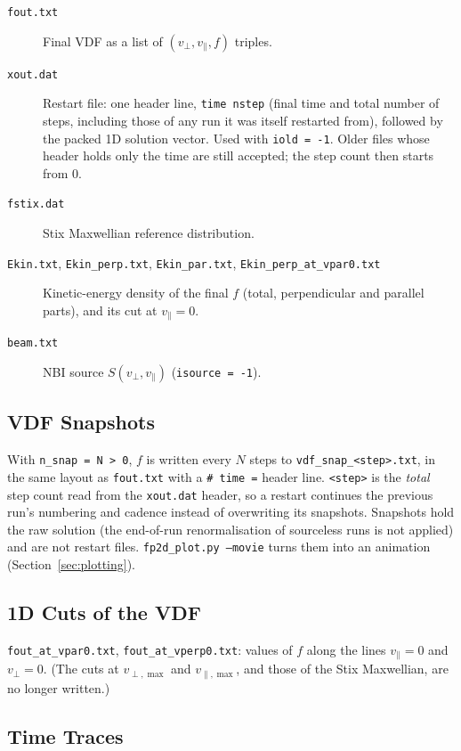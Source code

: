 \documentclass[11pt,a4paper]{article}
\newcommand{\vp}{v_\perp}
\newcommand{\vpa}{v_\parallel}
\newcommand{\vpmax}{v_{\perp,\max}}
\newcommand{\vpamax}{v_{\parallel,\max}}
\begin{document}
\begin{description}
  \item[\texttt{fout.txt}] Final VDF as a list of $(\vp, \vpa, f)$ triples.
  \item[\texttt{xout.dat}] Restart file: one header line, \texttt{time nstep}
        (final time and total number of steps, including those of any run it
        was itself restarted from), followed by the packed 1D solution vector.
        Used with \texttt{iold = -1}.  Older files whose header holds only the
        time are still accepted; the step count then starts from 0.
  \item[\texttt{fstix.dat}] Stix Maxwellian reference distribution.
  \item[\texttt{Ekin.txt}, \texttt{Ekin\_perp.txt}, \texttt{Ekin\_par.txt},
        \texttt{Ekin\_perp\_at\_vpar0.txt}] Kinetic-energy density of the final
        $f$ (total, perpendicular and parallel parts), and its cut at
        $\vpa = 0$.
  \item[\texttt{beam.txt}] NBI source $S(\vp,\vpa)$ (\texttt{isource = -1}).
\end{description}

\subsection{VDF Snapshots}
\label{sec:snap}

With \texttt{n\_snap = N > 0}, $f$ is written every $N$ steps to
\texttt{vdf\_snap\_<step>.txt}, in the same layout as \texttt{fout.txt} with a
\texttt{\# time =} header line.  \texttt{<step>} is the \emph{total} step count
read from the \texttt{xout.dat} header, so a restart continues the previous
run's numbering and cadence instead of overwriting its snapshots.  Snapshots
hold the raw solution (the end-of-run renormalisation of sourceless runs is not
applied) and are not restart files.  \texttt{fp2d\_plot.py --movie} turns them
into an animation (Section~\ref{sec:plotting}).

\subsection{1D Cuts of the VDF}

\texttt{fout\_at\_vpar0.txt}, \texttt{fout\_at\_vperp0.txt}: values of $f$
along the lines $\vpa = 0$ and $\vp = 0$.  (The cuts at $\vpmax$ and $\vpamax$,
and those of the Stix Maxwellian, are no longer written.)

\subsection{Time Traces}
\end{document}
